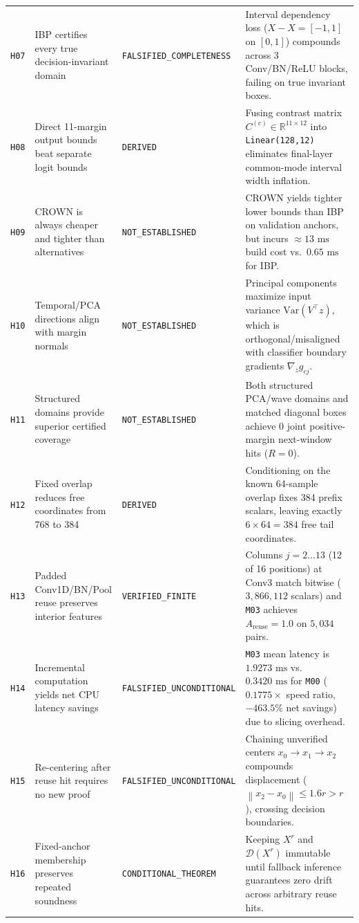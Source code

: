 \documentclass[11pt,a4paper]{article}
\newcommand{\R}{\mathbb{R}}
\newcommand{\norm}[1]{\left\lVert #1\right\rVert}
\newcommand{\code}[1]{{\small\ttfamily\nolinkurl{#1}}}
\newcommand{\Dset}{\mathcal{D}}
\theoremstyle{remark}
\begin{document}
{\begin{longtable}{@{}p{0.8cm}p{4.3cm}p{2.9cm}p{7.2cm}@{}}
\code{H07} & IBP certifies every true decision-invariant domain & \code{FALSIFIED\_COMPLETENESS} & Interval dependency loss ($X - X = [-1,1]$ on $[0,1]$) compounds across 3 Conv/BN/ReLU blocks, failing on true invariant boxes. \\
\code{H08} & Direct 11-margin output bounds beat separate logit bounds & \code{DERIVED} & Fusing contrast matrix $C^{(c)} \in \R^{11 \times 12}$ into \code{Linear(128,12)} eliminates final-layer common-mode interval width inflation. \\
\code{H09} & CROWN is always cheaper and tighter than alternatives & \code{NOT\_ESTABLISHED} & CROWN yields tighter lower bounds than IBP on validation anchors, but incurs $\approx 13\text{ ms}$ build cost vs.\ $0.65\text{ ms}$ for IBP. \\
\code{H10} & Temporal/PCA directions align with margin normals & \code{NOT\_ESTABLISHED} & Principal components maximize input variance $\text{Var}(V^\top z)$, which is orthogonal/misaligned with classifier boundary gradients $\nabla_z g_{cj}$. \\
\code{H11} & Structured domains provide superior certified coverage & \code{NOT\_ESTABLISHED} & Both structured PCA/wave domains and matched diagonal boxes achieve $0$ joint positive-margin next-window hits ($R=0$). \\
\code{H12} & Fixed overlap reduces free coordinates from 768 to 384 & \code{DERIVED} & Conditioning on the known 64-sample overlap fixes 384 prefix scalars, leaving exactly $6 \times 64 = 384$ free tail coordinates. \\
\code{H13} & Padded Conv1D/BN/Pool reuse preserves interior features & \code{VERIFIED\_FINITE} & Columns $j=2\dots13$ (12 of 16 positions) at Conv3 match bitwise ($3,866,112$ scalars) and \code{M03} achieves $A_{\text{reuse}}=1.0$ on $5,034$ pairs. \\
\code{H14} & Incremental computation yields net CPU latency savings & \code{FALSIFIED\_UNCONDITIONAL} & \code{M03} mean latency is $1.9273\text{ ms}$ vs.\ $0.3420\text{ ms}$ for \code{M00} ($0.1775\times$ speed ratio, $-463.5\%$ net savings) due to slicing overhead. \\
\code{H15} & Re-centering after reuse hit requires no new proof & \code{FALSIFIED\_UNCONDITIONAL} & Chaining unverified centers $x_0 \to x_1 \to x_2$ compounds displacement ($\norm{x_2 - x_0} \le 1.6r > r$), crossing decision boundaries. \\
\code{H16} & Fixed-anchor membership preserves repeated soundness & \code{CONDITIONAL\_THEOREM} & Keeping $X^r$ and $\Dset(X^r)$ immutable until fallback inference guarantees zero drift across arbitrary reuse hits. \\

\end{longtable}}
\end{document}
